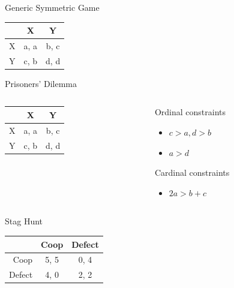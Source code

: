 \documentclass[
  14pt,
  letterpaper,
  ignorenonframetext,
  aspectratio=169,
]{beamer}
\providecommand{\tightlist}{%
  \setlength{\itemsep}{0pt}\setlength{\parskip}{0pt}}\usepackage{longtable,booktabs,array}
\let\olditem\item
\renewcommand{\item}{%
\olditem\vspace{6pt}}
\begin{document}
\begin{frame}[fragile]{Generic Symmetric Game}
\protect\hypertarget{generic-symmetric-game}{}
\begin{table}[!h]
\centering
\begin{tabular}[t]{>{}r|cc}
\toprule
 & X & Y\\
\midrule
X & a, a & b, c\\
Y & c, b & d, d\\
\bottomrule
\end{tabular}
\end{table}
\end{frame}

\begin{frame}[fragile]{Prisoners' Dilemma}
\protect\hypertarget{prisoners-dilemma-1}{}
\begin{columns}[T]
\begin{column}{0.4\textwidth}
\begin{table}[!h]
\centering
\begin{tabular}[t]{>{}r|cc}
\toprule
 & X & Y\\
\midrule
X & a, a & b, c\\
Y & c, b & d, d\\
\bottomrule
\end{tabular}
\end{table}
\end{column}

\begin{column}{0.6\textwidth}
Ordinal constraints

\begin{itemize}
\tightlist
\item
  \(c > a, d > b\)
\item
  \(a > d\)
\end{itemize}

Cardinal constraints

\begin{itemize}
\tightlist
\item
  \(2a > b + c\)
\end{itemize}
\end{column}
\end{columns}
\end{frame}

\begin{frame}[fragile]{Stag Hunt}
\protect\hypertarget{stag-hunt}{}
\begin{table}[!h]
\centering
\begin{tabular}[t]{>{}r|cc}
\toprule
 & Coop & Defect\\
\midrule
Coop & 5, 5 & 0, 4\\
Defect & 4, 0 & 2, 2\\
\bottomrule
\end{tabular}
\end{table}
\end{frame}
\end{document}
